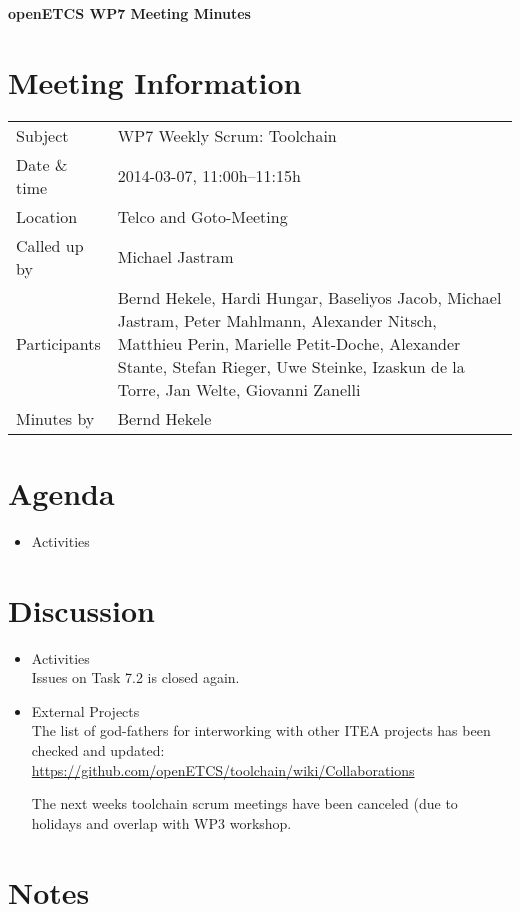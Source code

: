 \documentclass[a4paper, 11pt]{article}
\begin{document}
{\begin{center}\huge\bf openETCS WP7 Meeting Minutes\end{center}}
\section{Meeting Information}

\renewcommand{\arraystretch}{1.5}
\begin{supertabular}{m{.2\textwidth}m{.8\textwidth}}
Subject & WP7 Weekly Scrum: Toolchain\\
Date \& time & 2014-03-07, 11:00h--11:15h\\
Location & Telco and Goto-Meeting\\
Called up by & Michael Jastram\\
Participants &
Bernd Hekele,
Hardi Hungar,
Baseliyos Jacob,
Michael Jastram,
Peter Mahlmann,
Alexander Nitsch,
Matthieu Perin,
Marielle Petit-Doche,
Alexander Stante,
Stefan Rieger,
Uwe Steinke,
Izaskun de la Torre,
Jan Welte,
Giovanni Zanelli
\\

Minutes by & Bernd Hekele\\

\end{supertabular}
\renewcommand{\arraystretch}{1.0}


\section{Agenda}
\begin{itemize}
\item Activities
\end{itemize}

\section{Discussion}

\begin{itemize}
\item Activities\\
Issues on Task 7.2 is closed again.

\item External Projects\\
The list of god-fathers for interworking with other ITEA projects has been checked and updated: \url{https://github.com/openETCS/toolchain/wiki/Collaborations}

The next weeks toolchain scrum meetings have been canceled (due to holidays and overlap with WP3 workshop.

\end{itemize}

\section{Notes}
\end{document}
